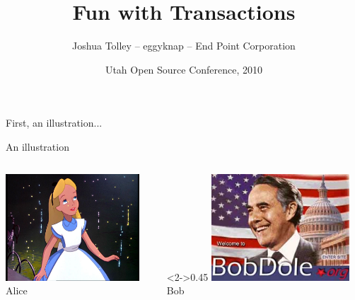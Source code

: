 \documentclass[svgnames]{beamer}
\begin{document}
\title{Fun with Transactions}
\author{Joshua Tolley -- eggyknap -- End Point Corporation}
\date[UTOSC 2010]{Utah Open Source Conference, 2010}

\frame{\titlepage}

\begin{frame}
    \begin{centering}
    First, an illustration...
    \par
    \end{centering}
\end{frame}
\begin{frame}{An illustration}
    \begin{columns}[t]
        \begin{column}{0.45\textwidth}
            \includegraphics[height=4cm]{alice-9.jpg}
            \\ Alice
        \end{column}
        \begin{column}<2->{0.45\textwidth}
            \includegraphics[height=4cm]{bobdole_org.jpg}
            \\ Bob
        \end{column}
    \end{columns}
    \vspace{10pt}
\end{frame}
\end{document}
